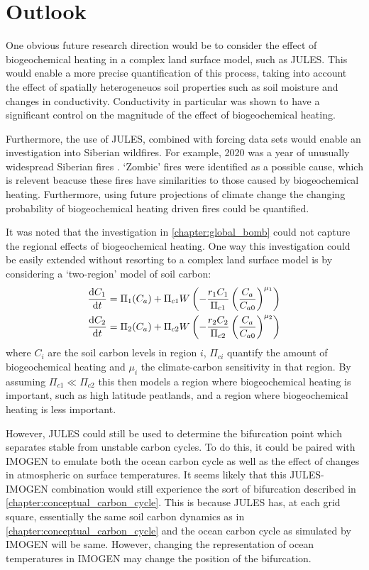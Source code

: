 \section{Outlook}
One obvious future research direction would be to consider the effect of biogeochemical heating in a complex land surface model, such as JULES.
This would enable a more precise quantification of this process, taking into account the effect of spatially heterogeneuos soil properties such as
soil moisture and changes in conductivity. Conductivity in particular was shown to have a significant control on the magnitude of the effect of biogeochemical heating.

Furthermore, the use of JULES, combined with forcing data sets would enable an investigation into Siberian wildfires. For example, 2020 was a year of unusually widespread
Siberian fires \parencite{Witze2020}. `Zombie' fires were identified as a possible cause, which is relevent beacuse these fires have similarities to those caused by biogeochemical heating.
Furthermore, using future projections of climate change the changing probability of biogeochemical heating driven fires could be quantified.

It was noted that the investigation in \cref{chapter:global_bomb} could not capture the regional effects of biogeochemical heating. One way this investigation could be easily extended without
resorting to a complex land surface model is by considering a `two-region' model of soil carbon:
\begin{subequations}
  \label{eq:two_region_model}
  \begin{align}
    \dv{C_1}{t} &= \Pi_1(C_a) + \Pi_{c1} W\left(-\frac{r_1C_1}{\Pi_{c1}} \left(\frac{C_a}{C_{a0}}\right)^{\mu_1} \right) \\
    \dv{C_2}{t} &= \Pi_2(C_a) + \Pi_{c2} W\left(-\frac{r_2C_2}{\Pi_{c2}} \left(\frac{C_a}{C_{a0}}\right)^{\mu_2} \right) \\
  \end{align}
\end{subequations}
where $C_i$ are the soil carbon levels in region $i$, $\Pi_{ci}$ quantify the amount of biogeochemical heating and $\mu_i$ the climate-carbon sensitivity in that region. By assuming
$\Pi_{c1} \ll \Pi_{c2}$ this then models a region where biogeochemical heating is important, such as high latitude peatlands, and a region where biogeochemical heating is less important.

However, JULES could still be used to determine the bifurcation point which separates stable from unstable carbon cycles. To do this, it could be paired with IMOGEN to emulate both the
ocean carbon cycle as well as the effect of changes in atmospheric  on surface temperatures. It seems likely that this JULES-IMOGEN combination would still experience the sort of
bifurcation described in \cref{chapter:conceptual_carbon_cycle}. This is because JULES has, at each grid square, essentially the same soil carbon dynamics as in \cref{chapter:conceptual_carbon_cycle}
and the ocean carbon cycle as simulated by IMOGEN will be same. However, changing the representation of ocean temperatures in IMOGEN may change the position of the bifurcation.
 
